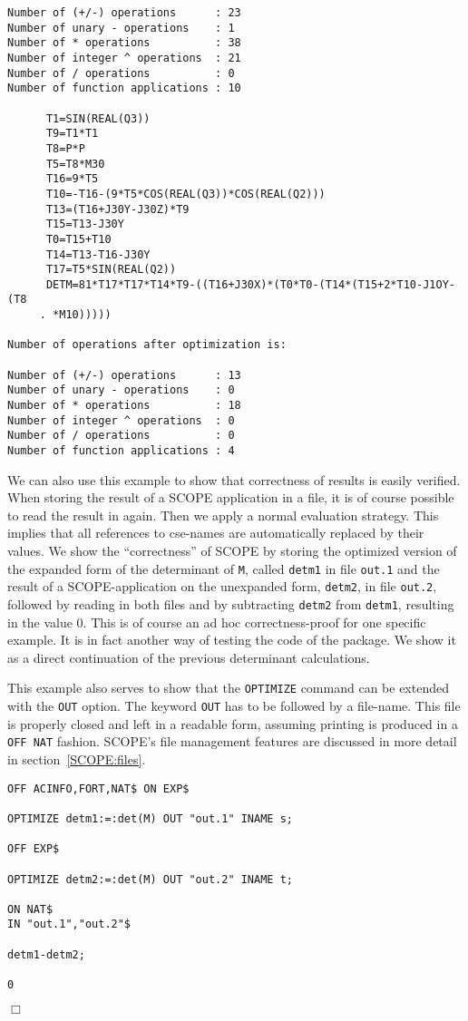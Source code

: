{\begin{verbatim}
Number of (+/-) operations      : 23
Number of unary - operations    : 1
Number of * operations          : 38
Number of integer ^ operations  : 21
Number of / operations          : 0
Number of function applications : 10

      T1=SIN(REAL(Q3))
      T9=T1*T1
      T8=P*P
      T5=T8*M30
      T16=9*T5
      T10=-T16-(9*T5*COS(REAL(Q3))*COS(REAL(Q2)))
      T13=(T16+J30Y-J30Z)*T9
      T15=T13-J30Y
      T0=T15+T10
      T14=T13-T16-J30Y
      T17=T5*SIN(REAL(Q2))
      DETM=81*T17*T17*T14*T9-((T16+J30X)*(T0*T0-(T14*(T15+2*T10-J1OY-(T8
     . *M10)))))

Number of operations after optimization is:

Number of (+/-) operations      : 13
Number of unary - operations    : 0
Number of * operations          : 18
Number of integer ^ operations  : 0
Number of / operations          : 0
Number of function applications : 4
\end{verbatim}}

We can also use this example to show that correctness of results is
easily verified. When storing
the result of a SCOPE application in a file, it is of course possible
to read the result in again. Then we apply a normal {\REDUCE} evaluation
strategy. This implies that all references to cse-names are automatically
replaced by their values.  We show the ``correctness'' of SCOPE by
storing the optimized version of the expanded form of the determinant
of {\tt M}, called {\tt detm1} in file {\tt out.1} and the result of a 
SCOPE-application on the unexpanded form, {\tt detm2}, in file {\tt out.2}, 
followed by reading in both files and by subtracting {\tt detm2} 
from {\tt detm1}, resulting in the value 0.
This is of course an ad hoc correctness-proof for one specific
example. It is in fact another way of testing the code of the package.
We show it as a direct continuation of the previous determinant calculations.

This example also serves to show that the {\tt OPTIMIZE} command can be 
extended with the {\tt OUT} option. The keyword {\tt OUT} has to be followed
by a file-name. This file is properly closed and left in a readable form,
assuming printing is produced in a {\tt OFF NAT} fashion.
SCOPE's file management features are discussed in more detail in 
section~\ref{SCOPE:files}.
{\small
\begin{verbatim}
OFF ACINFO,FORT,NAT$ ON EXP$

OPTIMIZE detm1:=:det(M) OUT "out.1" INAME s;

OFF EXP$

OPTIMIZE detm2:=:det(M) OUT "out.2" INAME t;

ON NAT$
IN "out.1","out.2"$

detm1-detm2;

0
\end{verbatim}
\begin{flushright}
$\Box$
\end{flushright}}

